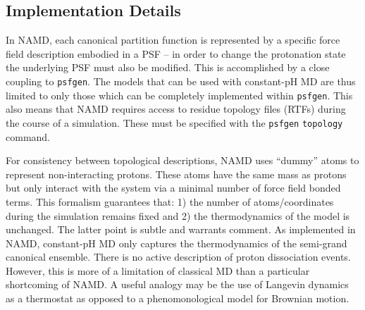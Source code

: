 \subsection{Implementation Details}

In NAMD, each canonical partition function is represented by a specific force
  field description embodied in a PSF -- in order to change the protonation
  state the underlying PSF must also be modified.
This is accomplished by a close coupling to \texttt{psfgen}.
The models that can be used with constant-pH MD are thus limited to only those
  which can be completely implemented within \texttt{psfgen}.
This also means that NAMD requires access to residue topology files (RTFs)
  during the course of a simulation.
These must be specified with the \texttt{psfgen} \texttt{topology} command.

For consistency between topological descriptions, NAMD uses ``dummy'' atoms to
  represent non-interacting protons.
These atoms have the same mass as protons but only interact with the system
  via a minimal number of force field bonded terms.
This formalism guarantees that:
  1) the number of atoms/coordinates during the simulation remains fixed
  and
  2) the thermodynamics of the model is unchanged.
The latter point is subtle and warrants comment.
As implemented in NAMD, constant-pH MD only captures the thermodynamics of
  the semi-grand canonical ensemble.
There is no active description of proton dissociation events.
However, this is more of a limitation of classical MD than a particular
  shortcoming of NAMD.
A useful analogy may be the use of Langevin dynamics as a thermostat as
  opposed to a phenomonological model for Brownian motion.

\begin{figure}[h]\end{figure}


